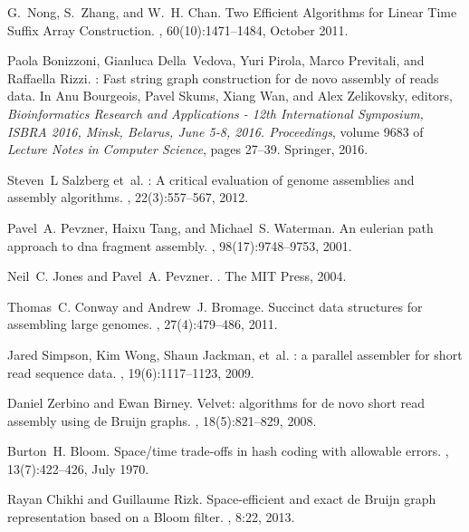 \documentclass[11pt,oneside,a4paper]{article}
\begin{document}
\begin{thebibliography}{10}
G.~Nong, S.~Zhang, and W.~H. Chan.
\newblock Two {Efficient} {Algorithms} for {Linear} {Time} {Suffix} {Array}
  {Construction}.
, 60(10):1471--1484, October
  2011.

Paola Bonizzoni, Gianluca Della~Vedova, Yuri Pirola, Marco Previtali, and
  Raffaella Rizzi.
: Fast string graph construction for de novo assembly of reads
  data.
\newblock In Anu Bourgeois, Pavel Skums, Xiang Wan, and Alex Zelikovsky,
  editors, {\em Bioinformatics Research and Applications - 12th International
  Symposium, {ISBRA} 2016, Minsk, Belarus, June 5-8, 2016. Proceedings}, volume
  9683 of {\em Lecture Notes in Computer Science}, pages 27--39. Springer,
  2016.

Steven~L Salzberg et~al.
: A critical evaluation of genome assemblies and assembly
  algorithms.
, 22(3):557--567, 2012.

Pavel~A. Pevzner, Haixu Tang, and Michael~S. Waterman.
\newblock An eulerian path approach to dna fragment assembly.
,
  98(17):9748--9753, 2001.

Neil~C. Jones and Pavel~A. Pevzner.
.
\newblock The MIT Press, 2004.

Thomas~C. Conway and Andrew~J. Bromage.
\newblock Succinct data structures for assembling large genomes.
, 27(4):479--486, 2011.

Jared Simpson, Kim Wong, Shaun Jackman, et~al.
: a parallel assembler for short read sequence data.
, 19(6):1117--1123, 2009.

Daniel Zerbino and Ewan Birney.
\newblock Velvet: algorithms for de novo short read assembly using {de Bruijn}
  graphs.
, 18(5):821--829, 2008.

Burton~H. Bloom.
\newblock Space/time trade-offs in hash coding with allowable errors.
, 13(7):422--426, July 1970.

Rayan Chikhi and Guillaume Rizk.
\newblock Space-efficient and exact de {Bruijn} graph representation based on a
  {Bloom} filter.
, 8:22, 2013.


\end{thebibliography}
\end{document}
